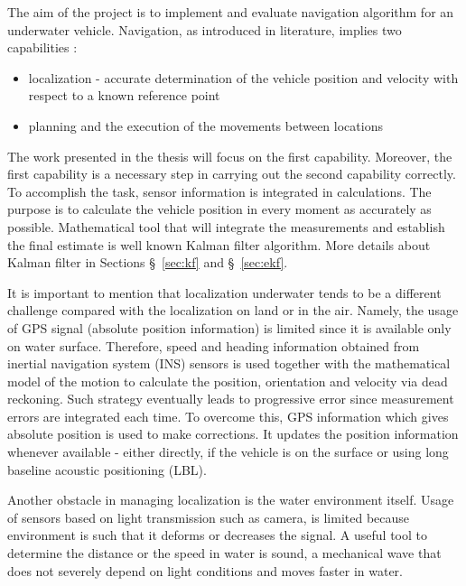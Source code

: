 The aim of the project is to implement and evaluate navigation algorithm for an underwater vehicle. Navigation, as introduced in literature, implies two capabilities \cite{farrell98}:
\begin{itemize}
\item localization - accurate determination of the vehicle position and velocity with respect to a known reference point
\item planning and the execution of the movements between locations   
\end{itemize} 
The work presented in the thesis will focus on the first capability. Moreover, the first capability is a necessary step in carrying out the second capability correctly. To accomplish the task, sensor information is integrated in calculations. The purpose is to calculate the vehicle position in every moment as accurately as possible. Mathematical tool that will integrate the measurements and establish the final estimate is well known Kalman filter \cite{kalman60} algorithm. More details about Kalman filter in Sections \S~\ref{sec:kf} and \S~\ref{sec:ekf}. 

It is important to mention that localization underwater tends to be a different challenge compared with the localization on land or in the air. Namely, the usage of GPS signal (absolute position information) is limited since it is available only on water surface. Therefore, speed and heading information obtained from inertial navigation system (INS) sensors is used together with the mathematical model of the motion to calculate the position, orientation and velocity via dead reckoning. Such strategy eventually leads to progressive error since measurement errors are integrated each time. To overcome this, GPS information which gives absolute position is used to make corrections. It updates the position information whenever available - either directly, if the vehicle is on the surface or using long baseline acoustic positioning (LBL).

Another obstacle in managing localization is the water environment itself. Usage of sensors based on light transmission such as camera, is limited because environment is such that it deforms or decreases the signal. A useful tool to determine the distance or the speed in water is sound, a mechanical wave that does not severely depend on light conditions and moves faster in water.  

